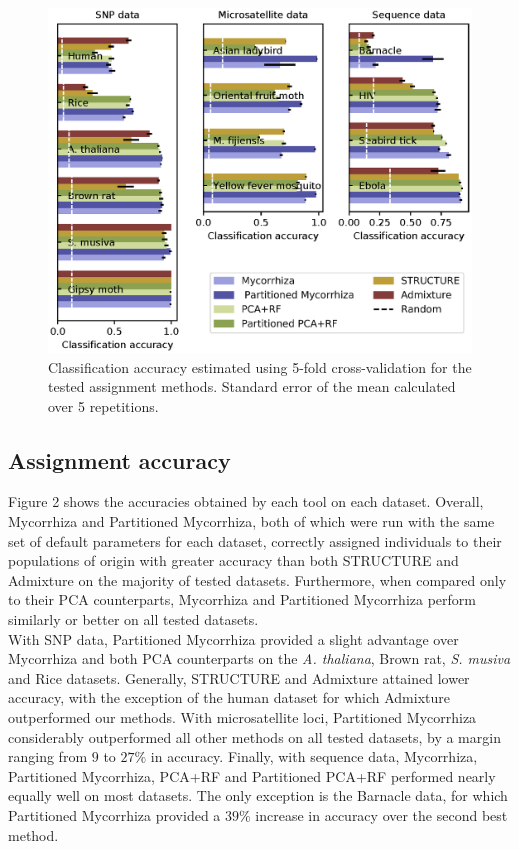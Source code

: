 \documentclass{bioinfo}
\begin{document}
\begin{figure}[!tbp]%
    \includegraphics[width=\linewidth]{figure2.eps}
    \caption{Classification accuracy estimated using 5-fold cross-validation for the tested assignment methods. Standard error of the mean calculated over 5 repetitions.}\label{fig:02}
\end{figure}

\subsection{Assignment accuracy}
Figure 2 shows the accuracies obtained by each tool on each dataset. Overall, Mycorrhiza and Partitioned Mycorrhiza, both of which were run with the same set of default parameters for each dataset, correctly assigned individuals to their populations of origin with greater accuracy than both STRUCTURE and Admixture on the majority of tested datasets. Furthermore, when compared only to their PCA counterparts, Mycorrhiza and Partitioned Mycorrhiza perform similarly or better on all tested datasets.\\
With SNP data, Partitioned Mycorrhiza provided a slight advantage over Mycorrhiza and both PCA counterparts on the \textit{A. thaliana}, Brown rat, \textit{S. musiva} and Rice datasets. Generally, STRUCTURE and Admixture attained lower accuracy, with the exception of the human dataset for which Admixture outperformed our methods. With microsatellite loci, Partitioned Mycorrhiza considerably outperformed all other methods on all tested datasets, by a margin ranging from $9$ to $27\%$ in accuracy. Finally, with sequence data, Mycorrhiza, Partitioned Mycorrhiza, PCA+RF and Partitioned PCA+RF performed nearly equally well on most datasets. The only exception is the Barnacle data, for which Partitioned Mycorrhiza provided a $39\%$ increase in accuracy over the second best method. 
\end{document}
